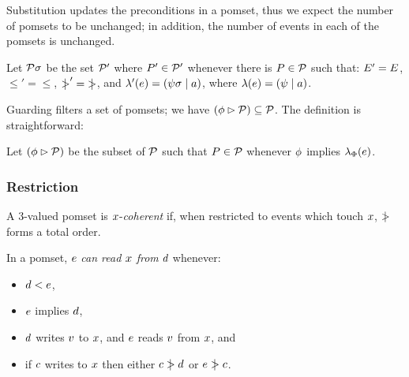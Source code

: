 Substitution updates the preconditions in a pomset, thus we expect the number
of pomsets to be unchanged; in addition, the number of events in each of the
pomsets is unchanged.
\begin{definition}
  Let $\mathcal{P}\sigma$ be the set $\mathcal{P}'$ where $P'\in\mathcal{P}'$ whenever
there is $P\in\mathcal{P}$ such that:
$E' = E$,
${\le'} = {\le}$, 
${\mathrel{\mkern4mu\mid\!\!\!>}'} = {\mathrel{\mkern4mu\mid\!\!\!>}}$,
and
$\lambda'(e) = (\psi\sigma \mid a)$, where $\lambda(e) = (\psi \mid a)$.
\end{definition}

Guarding filters a set of pomsets; we have
$(\phi\mathbin\rhd\mathcal{P})\subseteq\mathcal{P}$.
The definition is straightforward:
\begin{definition}
Let $(\phi \mathbin\rhd \mathcal{P})$ be the subset of $\mathcal{P}$ such that $P\in\mathcal{P}$ whenever
$\phi$ implies $\lambda_{\Phi}(e)$.
\end{definition}

\subsubsection{Restriction}
\label{sec:restriction}

\begin{definition}
  A 3-valued pomset is $x$-\emph{coherent}
  if, when restricted to events which touch $x$,
  $\mathrel{\mkern4mu\mid\!\!\!>}$ forms a total order.
\end{definition}


\begin{definition}\label{def:rf}
  In a pomset, $e$ \emph{can read $x$ from} $d$ whenever: 
  \begin{itemize}
  \item $d < e$,  
  \item $e$ implies $d$,
  \item $d$ writes $v$ to $x$,
    and $e$ reads $v$ from $x$, and
  \item if $c$ writes to $x$
    then either $c \mathrel{\mkern4mu\mid\!\!\!>} d$ or $e \mathrel{\mkern4mu\mid\!\!\!>} c$.
  \end{itemize}
\end{definition}


